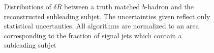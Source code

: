 \begin{figure}[!htbp]
  \centering
   \hfill

  \caption{\cite{ATL-PHYS-PUB-2017-010} Distributions of $\delta R$ between a
truth matched $b$-hadron and the reconstructed subleading subjet.  The
uncertainties given reflect only statistical uncertanties.  All algorithms are
normalized to an area corresponding to the fraction of signal jets which
contain a subleading subjet} 
  \label{sec:objects:subleading_vr}
\end{figure}



